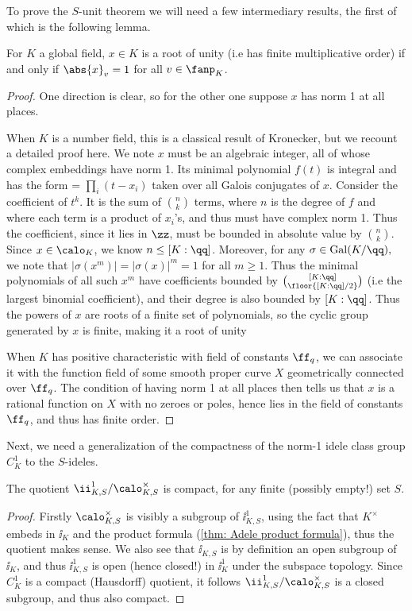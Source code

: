 \documentclass[11pt, x11names, openany]{book}
\begin{document}
To prove the $S$-unit theorem we will need a few intermediary results, the first of which is the following lemma.

\begin{lemma}
\label{lemma: root of unity if and only if norm one at all places}
For $K$ a global field, $x \in K$ is a root of unity (i.e has finite multiplicative order) if and only if $\abs{x}_v = 1$ for all $v \in \fanp_K$.
\end{lemma}
\begin{proof}
One direction is clear, so for the other one suppose $x$ has norm 1 at all places.

When $K$ is a number field, this is a classical result of Kronecker, but we recount a detailed proof here. We note $x$ must be an algebraic integer, all of whose complex embeddings have norm 1. Its minimal polynomial $f(t)$ is integral and has the form = $\prod_i (t - x_i)$ taken over all Galois conjugates of $x$. Consider the coefficient of $t^k$. It is the sum of $\binom{n}{k}$ terms, where $n$ is the degree of $f$ and where each term is a product of $x_i$'s, and thus must have complex norm 1. Thus the coefficient, since it lies in $\zz$, must be bounded in absolute value by $\binom{n}{k}$. Since $x \in \calo_K$, we know $n \leq [K : \qq]$. Moreover, for any $\sigma \in \gal(K/\qq),$ we note that $|\sigma(x^m)| = |\sigma(x)|^m = 1$ for all $m \geq 1$. Thus the minimal polynomials of all such $x^m$ have coefficients bounded by $\binom{[K : \qq]}{\floor{[K : \qq]/2}}$ (i.e the largest binomial coefficient), and their degree is also bounded by $[K: \qq]$. Thus the powers of $x$ are roots of a finite set of polynomials, so the cyclic group generated by $x$ is finite, making it a root of unity

When $K$ has positive characteristic with field of constants $\ff_q$, we can associate it with the function field of some smooth proper curve $X$ geometrically connected over $\ff_q$. The condition of having norm 1 at all places then tells us that $x$ is a rational function on $X$ with no zeroes or poles, hence lies in the field of constants $\ff_q$, and thus has finite order.
\end{proof}

Next, we need a generalization of the compactness of the norm-1 idele class group $C^1_K$ to the $S$-ideles. 

\begin{lemma}
\label{lemma: O_K, S is cocompact}
    The quotient $\ii^1_{K, S}/ \calo_{K, S}^\times$ is compact, for any finite (possibly empty!) set $S$.
\end{lemma}
\begin{proof}
    Firstly $\calo_{K, S}^\times$ is visibly a subgroup of $\ii^1_{K, S}$, using the fact that $K^\times$ embeds in $\ii_K$ and the product formula (\ref{thm: Adele product formula}), thus the quotient makes sense. We also see that $\ii_{K, S}$ is by definition an open subgroup of $\ii_K$, and thus $\ii_{K, S}^1$ is open (hence closed!) in $\ii_K^1$ under the subspace topology. Since $C^1_K$ is a compact (Hausdorff) quotient, it follows $\ii^1_{K, S}/ \calo_{K, S}^\times$ is a closed subgroup, and thus also compact.
\end{proof}
\end{document}
